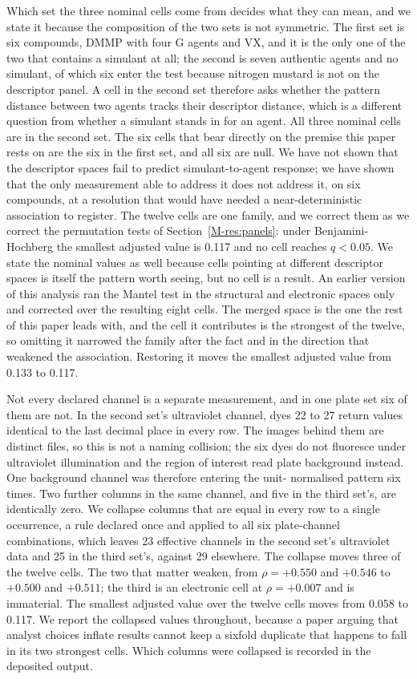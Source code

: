 \documentclass[11pt,a4paper]{article}
\begin{document}
Which set the three nominal cells come from decides what they can mean, and we
state it because the composition of the two sets is not symmetric. The first set is
six compounds, DMMP with four G agents and VX, and it is the only one of the two
that contains a simulant at all; the second is seven authentic agents and no
simulant, of which six enter the test because nitrogen mustard is not on the
descriptor panel. A cell in the second set therefore asks whether the pattern distance
between two agents tracks their descriptor distance, which is a different
question from whether a simulant stands in for an agent. All three nominal cells
are in the second set. The six cells that bear directly on the premise this
paper rests on are the six in the first set, and all six are null. We have not
shown that the descriptor spaces fail to predict simulant-to-agent response; we
have shown that the only measurement able to address it does not address it, on
six compounds, at a resolution that would have needed a near-deterministic
association to register. The twelve cells are one
family, and we correct them as we correct the permutation tests of
Section~\ref{M-res:panels}: under Benjamini-Hochberg the smallest adjusted value is
0.117 and no cell reaches $q<0.05$. We state the nominal values as well because
cells pointing at different descriptor spaces is itself the pattern worth
seeing, but no cell is a result. An earlier version of this analysis ran the
Mantel test in the structural and electronic spaces only and corrected over the
resulting eight cells. The merged space is the one the rest of this paper leads
with, and the cell it contributes is the strongest of the twelve, so omitting it
narrowed the family after the fact and in the direction that weakened the
association. Restoring it moves the smallest adjusted value from 0.133 to
0.117.

Not every declared channel is a separate measurement, and in one plate set six of
them are not. In the second set's ultraviolet channel, dyes 22 to 27 return
values identical to the last decimal place in every row. The images behind them
are distinct files, so this is not a naming collision; the six dyes do not
fluoresce under ultraviolet illumination and the region of interest read plate
background instead. One background channel was therefore entering the unit-
normalised pattern six times. Two further columns in the same channel, and five
in the third set's, are identically zero. We collapse columns that are equal in
every row to a single occurrence, a rule declared once and applied to all six
plate-channel combinations, which leaves 23 effective channels in the second
set's ultraviolet data and 25 in the third set's, against 29 elsewhere. The
collapse moves three of the twelve cells. The two that matter weaken, from
$\rho = +0.550$ and $+0.546$ to $+0.500$ and $+0.511$; the third is an
electronic cell at $\rho = +0.007$ and is immaterial. The smallest adjusted
value over the twelve cells moves from 0.058 to 0.117. We report the collapsed values throughout, because a
paper arguing that analyst choices inflate results cannot keep a sixfold
duplicate that happens to fall in its two strongest cells. Which columns were
collapsed is recorded in the deposited output.
\end{document}
